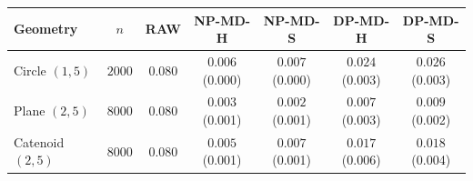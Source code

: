 \begin{tabular}{lcccccc}
\toprule
Geometry & $n$ & RAW & NP-MD-H & NP-MD-S & DP-MD-H & DP-MD-S \\
\midrule
Circle $(1,5)$ & $2000$ & $0.080$ & $0.006$ \scriptsize(0.000) & $0.007$ \scriptsize(0.000) & $0.024$ \scriptsize(0.003) & $0.026$ \scriptsize(0.003) \\
\midrule
Plane $(2,5)$ & $8000$ & $0.080$ & $0.003$ \scriptsize(0.001) & $0.002$ \scriptsize(0.001) & $0.007$ \scriptsize(0.003) & $0.009$ \scriptsize(0.002) \\
\midrule
Catenoid $(2,5)$ & $8000$ & $0.080$ & $0.005$ \scriptsize(0.001) & $0.007$ \scriptsize(0.001) & $0.017$ \scriptsize(0.006) & $0.018$ \scriptsize(0.004) \\
\bottomrule
\end{tabular}

